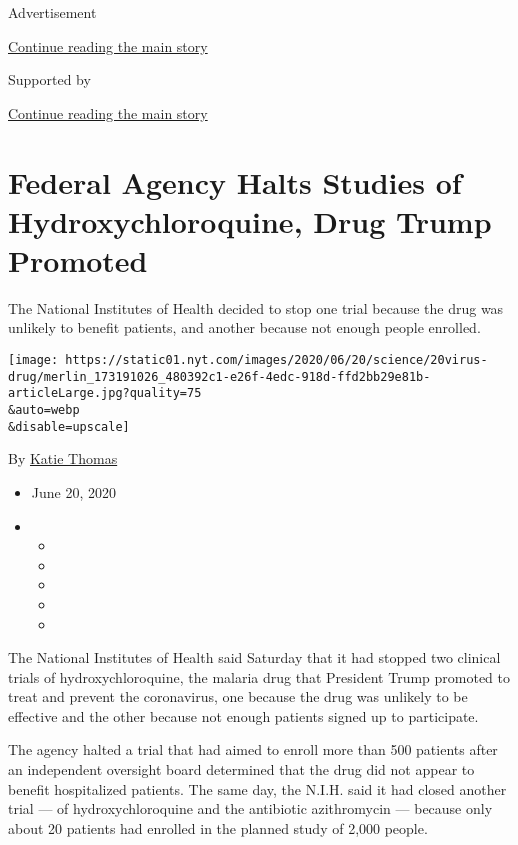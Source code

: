 Advertisement

\protect\hyperlink{after-top}{Continue reading the main story}

Supported by

\protect\hyperlink{after-sponsor}{Continue reading the main story}

\hypertarget{federal-agency-halts-studies-of-hydroxychloroquine-drug-trump-promoted}{%
\section{Federal Agency Halts Studies of Hydroxychloroquine, Drug Trump
Promoted}\label{federal-agency-halts-studies-of-hydroxychloroquine-drug-trump-promoted}}

The National Institutes of Health decided to stop one trial because the
drug was unlikely to benefit patients, and another because not enough
people enrolled.

\texttt{[image: https://static01.nyt.com/images/2020/06/20/science/20virus-drug/merlin\_173191026\_480392c1-e26f-4edc-918d-ffd2bb29e81b-articleLarge.jpg?quality=75\\\&auto=webp\\\&disable=upscale]}

By \href{https://www.nytimes.com/by/katie-thomas}{Katie Thomas}

\begin{itemize}
\item
  June 20, 2020
\item
  \begin{itemize}
  \item
  \item
  \item
  \item
  \item
  \end{itemize}
\end{itemize}

The National Institutes of Health said Saturday that it had stopped two
clinical trials of hydroxychloroquine, the malaria drug that President
Trump promoted to treat and prevent the coronavirus, one because the
drug was unlikely to be effective and the other because not enough
patients signed up to participate.

The agency halted a trial that had aimed to enroll more than 500
patients after an independent oversight board determined that the drug
did not appear to benefit hospitalized patients. The same day, the
N.I.H. said it had closed another trial --- of hydroxychloroquine and
the antibiotic azithromycin --- because only about 20 patients had
enrolled in the planned study of 2,000 people.

